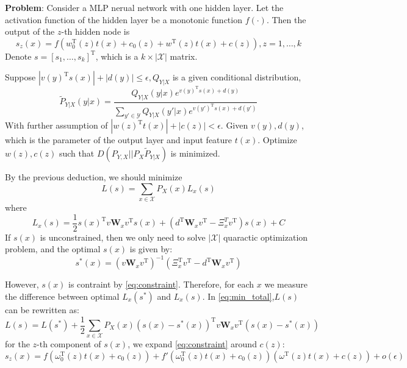 \documentclass{article}
\def\T{\mathrm{T}}
\begin{document}
\textbf{Problem}: 
Consider a MLP nerual network with one hidden layer. Let the activation function of the hidden layer be a monotonic function $f(\cdot)$. Then the output of the $z$-th hidden node is
\begin{equation}\label{eq:constraint}
s_z(x)=f(w_0^\T(z)t(x)+c_0(z)+w^\T(z)t(x)+c(z)),z=1,\dots,k
\end{equation}
Denote $s=[s_1,\dots,s_k]^\T$, which is a $k \times|\mathcal{X}|$ matrix.

Suppose $|v(y)^\T s(x)|+|d(y)|\leq \epsilon,Q_{Y|X}$ is a given conditional distribution,
$$\tilde{P}_{Y|X}(y|x)=\frac{Q_{Y|X}(y|x) e^{v(y)^\T s(x)+d(y)}}{\sum_{y'\in \mathcal{Y}} Q_{Y|X}(y'|x) e^{v(y')^\T s(x)+d(y')}}$$
With further assumption of $|w(z)^\T t(x)|+|c(z)|<\epsilon$. Given $v(y),d(y)$, which is the parameter of the output layer and input feature $t(x)$. Optimize $w(z),c(z)$ such that $D(P_{Y,X}||P_X \tilde{P}_{Y|X})$ is minimized.

By the previous deduction, we should minimize
\begin{equation}\label{eq:min_total}
L(s)=\sum_{x\in \mathcal{X}} P_X(x)L_x(s)
\end{equation}
where
\begin{equation}\label{eq:min_each}
L_x(s)=\frac{1}{2}s(x)^\T v \bm{W}_x v^\T s(x) +(d^\T \bm{W}_x v^\T-\Xi_x^T v^\T) s(x)+C
\end{equation}
If $s(x)$ is unconstrained, then we only need to solve $|\mathcal{X}|$ quaractic optimization problem, and the optimal $s(x)$ is given by:
\begin{equation}
s^*(x)=(v\bm{W}_xv^\T)^{-1}(\Xi_x^\T v^\T -d^\T \bm{W}_x v^\T)
\end{equation}

However, $s(x)$ is contraint by \eqref{eq:constraint}. Therefore, for each $x$ we measure the difference between optimal $L_x(s^*)$ and $L_x(s)$.
In \eqref{eq:min_total},$L(s)$ can be rewritten as:
\begin{equation}\label{eq:total_sim}
L(s)=L(s^*)+\frac{1}{2}\sum_{x\in\mathcal{X}}P_X(x)(s(x)-s^*(x))^\T v \bm{W}_x v^\T (s(x)-s^*(x))
\end{equation}
for the $z$-th component of $s(x)$, we expand \eqref{eq:constraint} around $c(z)$:
\begin{equation}
s_z(x) = f(\omega_0^\T (z) t(x) + c_0 (z) ) + f'(\omega_0 ^\T (z) t(x) + c_0(z)) (\omega^\T(z) t(x)+c(z))+ o(\epsilon)
\end{equation}
\end{document}

